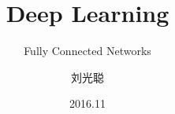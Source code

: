 \title[Deep Learning]
{Deep Learning}

\subtitle{Fully Connected Networks}

\author[Horance]
{ 刘光聪
}


\date[2016.11]{2016.11}
